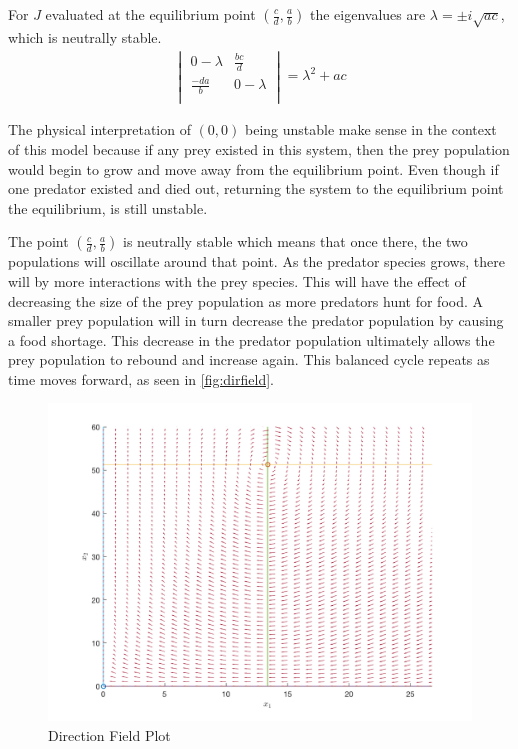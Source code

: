\documentclass[12pt]{article}   %
\theoremstyle{definition}
\numberwithin{equation}{section}
\begin{document}
For $J$ evaluated at the equilibrium point $(\frac{c}{d},\frac{a}{b})$ the eigenvalues are  $\lambda=\pm i\sqrt{ac}$, which is neutrally stable.
\begin{align*}
  \begin{vmatrix}
    0-\lambda & \frac{bc}{d}\\
    \frac{-da}{b} & 0-\lambda\\
  \end{vmatrix}
  =\lambda^2+ac
\end{align*}

\quad The physical interpretation of $(0,0)$ being unstable make sense in the context of this model because if any prey existed in this system, then the prey population would begin to grow and move away from the equilibrium point. Even though if one predator existed and died out, returning the system to the equilibrium point the equilibrium, is still unstable. 

\quad The point $(\frac{c}{d},\frac{a}{b})$ is neutrally stable which means that once there, the two populations will oscillate around that point. As the predator species grows, there will by more interactions with the prey species. This will have the effect of decreasing the size of the prey population as more predators hunt for food. A smaller prey population will in turn decrease the predator population by causing a food shortage. This decrease in the predator population ultimately allows the prey population to rebound and increase again. This balanced cycle repeats as time moves forward, as seen in \autoref{fig:dirfield}. 

\begin{figure} [h] 
  \centering
  \includegraphics[width=15cm]{dirfield.png}
  \caption{Direction Field Plot}
  \label{fig:dirfield}
\end{figure}
\end{document}
